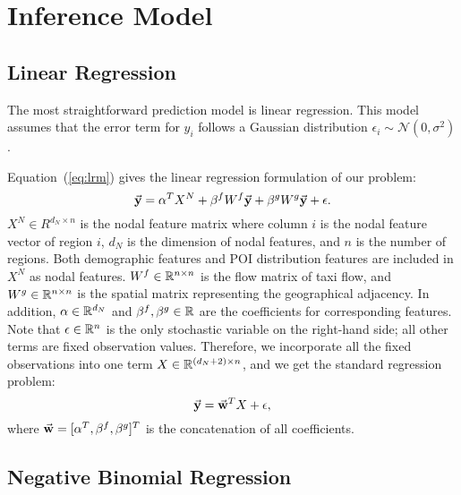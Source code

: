 
\section{Inference Model}
\label{ch5-sec:model}


\subsection{Linear Regression}


The most straightforward prediction model is linear regression. This model assumes that the error term for $y_i$ follows a Gaussian distribution $\epsilon_i \sim \mathcal{N}(0, \sigma^2)$.


Equation~(\ref{eq:lrm}) gives the linear regression formulation of our problem:
\begin{equation}
\label{eq:lrm}
\vec{\mathbf{y}} =  \alpha^T X^N + \beta^f W^f \vec{\mathbf{y}} + \beta^g W^g \vec{\mathbf{y}} + \epsilon.
\end{equation}
$X^N \in R^{d_N \times n}$ is the nodal feature matrix where column $i$ is the nodal feature vector of region $i$, $d_N$ is the dimension of nodal features, and $n$ is the number of regions. Both demographic features and POI distribution features are included in $X^N$ as nodal features. $W^f \in \mathbb{R}^{n \times n}$ is the flow matrix of taxi flow, and $W^g \in \mathbb{R}^{n \times n}$ is the spatial matrix representing the geographical adjacency. In addition, $\alpha \in \mathbb{R}^{d_N}$ and $\beta^f, \beta^g \in \mathbb{R}$ are the coefficients for corresponding features. Note that $\epsilon \in \mathbb{R}^n$ is the only stochastic variable on the right-hand side; all other terms are fixed observation values. Therefore, we incorporate all the fixed observations into one term $X \in \mathbb{R}^{(d_N + 2)\times n}$, and we get the standard regression problem:
\[
\vec{\mathbf{y}}= \vec{\mathbf{w}}^T X + \epsilon,
\]
where $\vec{\mathbf{w}} = [\alpha^T, \beta^f, \beta^g]^T$ is the concatenation of all coefficients.


\subsection{Negative Binomial Regression}


